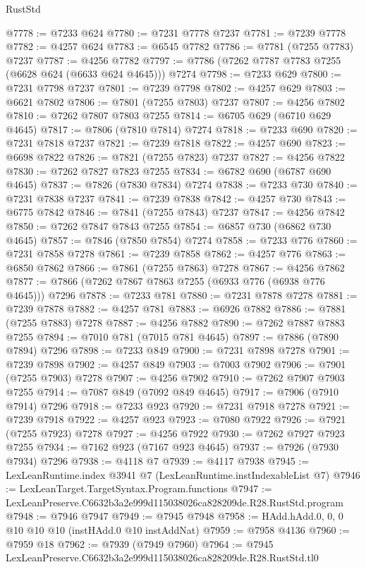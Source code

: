 \begin{lexlean}{RustStd}
\begin{coremodule}
@7778 := @7233 @624
@7780 := @7231 @7778 @7237
@7781 := @7239 @7778
@7782 := @4257 @624
@7783 := @6545 @7782
@7786 := @7781 (@7255 @7783) @7237
@7787 := @4256 @7782
@7797 := @7786 (@7262 @7787 @7783 @7255 (@6628 @624 (@6633 @624 @4645))) @7274
@7798 := @7233 @629
@7800 := @7231 @7798 @7237
@7801 := @7239 @7798
@7802 := @4257 @629
@7803 := @6621 @7802
@7806 := @7801 (@7255 @7803) @7237
@7807 := @4256 @7802
@7810 := @7262 @7807 @7803 @7255
@7814 := @6705 @629 (@6710 @629 @4645)
@7817 := @7806 (@7810 @7814) @7274
@7818 := @7233 @690
@7820 := @7231 @7818 @7237
@7821 := @7239 @7818
@7822 := @4257 @690
@7823 := @6698 @7822
@7826 := @7821 (@7255 @7823) @7237
@7827 := @4256 @7822
@7830 := @7262 @7827 @7823 @7255
@7834 := @6782 @690 (@6787 @690 @4645)
@7837 := @7826 (@7830 @7834) @7274
@7838 := @7233 @730
@7840 := @7231 @7838 @7237
@7841 := @7239 @7838
@7842 := @4257 @730
@7843 := @6775 @7842
@7846 := @7841 (@7255 @7843) @7237
@7847 := @4256 @7842
@7850 := @7262 @7847 @7843 @7255
@7854 := @6857 @730 (@6862 @730 @4645)
@7857 := @7846 (@7850 @7854) @7274
@7858 := @7233 @776
@7860 := @7231 @7858 @7278
@7861 := @7239 @7858
@7862 := @4257 @776
@7863 := @6850 @7862
@7866 := @7861 (@7255 @7863) @7278
@7867 := @4256 @7862
@7877 := @7866 (@7262 @7867 @7863 @7255 (@6933 @776 (@6938 @776 @4645))) @7296
@7878 := @7233 @781
@7880 := @7231 @7878 @7278
@7881 := @7239 @7878
@7882 := @4257 @781
@7883 := @6926 @7882
@7886 := @7881 (@7255 @7883) @7278
@7887 := @4256 @7882
@7890 := @7262 @7887 @7883 @7255
@7894 := @7010 @781 (@7015 @781 @4645)
@7897 := @7886 (@7890 @7894) @7296
@7898 := @7233 @849
@7900 := @7231 @7898 @7278
@7901 := @7239 @7898
@7902 := @4257 @849
@7903 := @7003 @7902
@7906 := @7901 (@7255 @7903) @7278
@7907 := @4256 @7902
@7910 := @7262 @7907 @7903 @7255
@7914 := @7087 @849 (@7092 @849 @4645)
@7917 := @7906 (@7910 @7914) @7296
@7918 := @7233 @923
@7920 := @7231 @7918 @7278
@7921 := @7239 @7918
@7922 := @4257 @923
@7923 := @7080 @7922
@7926 := @7921 (@7255 @7923) @7278
@7927 := @4256 @7922
@7930 := @7262 @7927 @7923 @7255
@7934 := @7162 @923 (@7167 @923 @4645)
@7937 := @7926 (@7930 @7934) @7296
@7938 := @4118 @7
@7939 := @4117 @7938
@7945 := LexLeanRuntime.index @3941 @7 (LexLeanRuntime.instIndexableList @7)
@7946 := LexLeanTarget.TargetSyntax.Program.functions
@7947 := LexLeanPreserve.C6632b3a2e999d115038026ca828209de.R28.RustStd.program
@7948 := @7946 @7947
@7949 := @7945 @7948
@7958 := HAdd.hAdd.{0, 0, 0} @10 @10 @10 (instHAdd.{0} @10 instAddNat)
@7959 := @7958 @4136
@7960 := @7959 @18
@7962 := @7939 (@7949 @7960)
@7964 := @7945 LexLeanPreserve.C6632b3a2e999d115038026ca828209de.R28.RustStd.tl0

\end{coremodule}
\end{lexlean}
